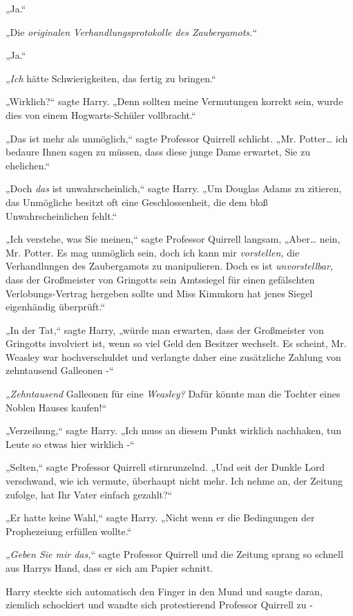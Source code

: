 {„Ja.“

„Die \emph{originalen Verhandlungsprotokolle des Zaubergamots.}“

„Ja.“

„\emph{Ich} hätte Schwierigkeiten, das fertig zu bringen.“

„Wirklich?“ sagte Harry. „Denn sollten meine Vermutungen korrekt sein, wurde dies von einem Hogwarts-Schüler vollbracht.“

„Das ist mehr als unmöglich,“ sagte Professor Quirrell schlicht. „Mr. Potter… ich bedaure Ihnen sagen zu müssen, dass diese junge Dame erwartet, Sie zu ehelichen.“

„Doch \emph{das} ist unwahrscheinlich,“ sagte Harry. „Um Douglas Adams zu zitieren, das Unmögliche besitzt oft eine Geschlossenheit, die dem bloß Unwahrscheinlichen fehlt.“

„Ich verstehe, was Sie meinen,“ sagte Professor Quirrell langsam, „Aber… nein, Mr. Potter. Es mag unmöglich sein, doch ich kann mir \emph{vorstellen,} die Verhandlungen des Zaubergamots zu manipulieren. Doch es ist \emph{unvorstellbar,} dass der Großmeister von Gringotts sein Amtssiegel für einen gefälschten Verlobungs-Vertrag hergeben sollte und Miss Kimmkorn hat jenes Siegel eigenhändig überprüft.“

„In der Tat,“ sagte Harry, „würde man erwarten, dass der Großmeister von Gringotts involviert ist, wenn so viel Geld den Besitzer wechselt. Es scheint, Mr. Weasley war hochverschuldet und verlangte daher eine zusätzliche Zahlung von zehntausend Galleonen -“

„\emph{Zehntausend} Galleonen für eine \emph{Weasley?} Dafür könnte man die Tochter eines Noblen Hauses kaufen!“

„Verzeihung,“ sagte Harry. „Ich muss an diesem Punkt wirklich nachhaken, tun Leute so etwas hier wirklich -“

„Selten,“ sagte Professor Quirrell stirnrunzelnd. „Und seit der Dunkle Lord verschwand, wie ich vermute, überhaupt nicht mehr. Ich nehme an, der Zeitung zufolge, hat Ihr Vater einfach gezahlt?“

„Er hatte keine Wahl,“ sagte Harry. „Nicht wenn er die Bedingungen der Prophezeiung erfüllen wollte.“

„\emph{Geben Sie mir das,}“ sagte Professor Quirrell und die Zeitung sprang so schnell aus Harrys Hand, dass er sich am Papier schnitt.

Harry steckte sich automatisch den Finger in den Mund und saugte daran, ziemlich schockiert und wandte sich protestierend Professor Quirrell zu -

}
